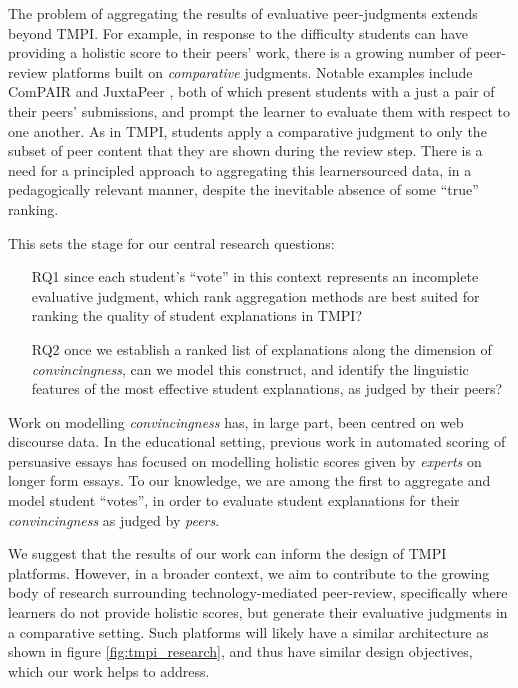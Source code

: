 \documentclass[notitlepage,12pt]{jedm}
\begin{document}
The problem of aggregating the results of evaluative peer-judgments extends  
beyond TMPI.
For example, in response to the difficulty students can have providing a 
holistic score to their peers' work, there is a growing number of peer-review 
platforms built on \textit{comparative} judgments.
Notable examples include ComPAIR \cite{potter_compair:_2017} and 
JuxtaPeer \cite{cambre_juxtapeer:_2018}, both of which present students with a 
just a pair of their peers' submissions, and prompt the learner to evaluate 
them with respect to one another.
As in TMPI, students apply a comparative judgment to only the subset of peer 
content that they are shown during the review step.
There is a need for a principled approach to aggregating this learnersourced 
data, in a pedagogically relevant manner, despite the inevitable absence of 
some ``true'' ranking.

This sets the stage for our central research questions: 
\begin{itemize}
	\item[RQ1] since each student's ``vote'' in this context represents an 
	incomplete evaluative judgment, which rank aggregation 
	methods are best suited for ranking the quality of student 
	explanations in TMPI?
	\item[RQ2] once we establish a ranked list of explanations along the 
	dimension of \textit{convincingness}, can we model this construct, and 
	identify the linguistic features of the most effective student 
	explanations, as judged by their peers?
\end{itemize}

Work on modelling \textit{convincingness} has, in large part, been centred on 
web discourse data.
In the educational setting, previous work in automated scoring of persuasive 
essays has focused on modelling holistic scores given by \textit{experts} on 
longer form essays.
To our knowledge, we are among the first to aggregate and model student 
``votes'', in order to evaluate student explanations for their 
\textit{convincingness} as judged by \textit{peers}.

We suggest that the results of our work can inform the design of TMPI platforms.
However, in a broader context, we aim to contribute to the growing body of 
research surrounding technology-mediated peer-review, specifically where 
learners do not provide holistic scores, but generate their evaluative 
judgments in a comparative setting. 
Such platforms will likely have a similar architecture as shown in figure 
\ref{fig:tmpi_research}, and thus have similar design objectives, which 
our work helps to address.
\end{document}
